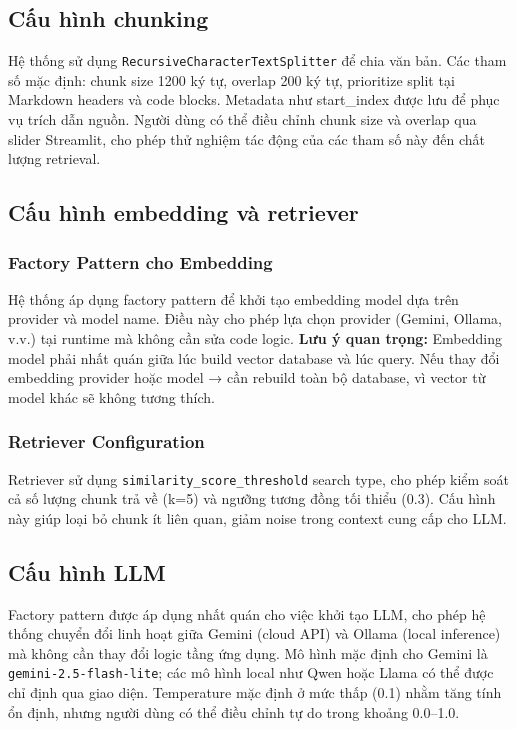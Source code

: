 \documentclass[10pt, conference, a4paper, compsocconf]{IEEEtran}
\begin{document}
\subsection{Cấu hình chunking}
Hệ thống sử dụng \texttt{RecursiveCharacterTextSplitter} để chia văn bản. Các tham số mặc định: chunk size 1200 ký tự, overlap 200 ký tự, prioritize split tại Markdown headers và code blocks. Metadata như start\_index được lưu để phục vụ trích dẫn nguồn. Người dùng có thể điều chỉnh chunk size và overlap qua slider Streamlit, cho phép thử nghiệm tác động của các tham số này đến chất lượng retrieval.

\subsection{Cấu hình embedding và retriever}
\subsubsection{Factory Pattern cho Embedding}
Hệ thống áp dụng factory pattern để khởi tạo embedding model dựa trên provider và model name. Điều này cho phép lựa chọn provider (Gemini, Ollama, v.v.) tại runtime mà không cần sửa code logic. \textbf{Lưu ý quan trọng:} Embedding model phải nhất quán giữa lúc build vector database và lúc query. Nếu thay đổi embedding provider hoặc model → cần rebuild toàn bộ database, vì vector từ model khác sẽ không tương thích.

\subsubsection{Retriever Configuration}
Retriever sử dụng \texttt{similarity\_score\_threshold} search type, cho phép kiểm soát cả số lượng chunk trả về (k=5) và ngưỡng tương đồng tối thiểu (0.3). Cấu hình này giúp loại bỏ chunk ít liên quan, giảm noise trong context cung cấp cho LLM.

\subsection{Cấu hình LLM}
Factory pattern được áp dụng nhất quán cho việc khởi tạo LLM, cho phép hệ thống chuyển đổi linh hoạt giữa Gemini (cloud API) và Ollama (local inference) mà không cần thay đổi logic tầng ứng dụng. Mô hình mặc định cho Gemini là \verb|gemini-2.5-flash-lite|; các mô hình local như Qwen hoặc Llama có thể được chỉ định qua giao diện. Temperature mặc định ở mức thấp (0.1) nhằm tăng tính ổn định, nhưng người dùng có thể điều chỉnh tự do trong khoảng 0.0--1.0.
\end{document}
